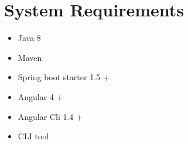 \chapter{System Requirements}
\begin{itemize}
    \item Java 8
    \item Maven
    \item Spring boot starter 1.5 +
    \item Angular 4 +
    \item Angular Cli 1.4 +
    \item CLI tool
\end{itemize}